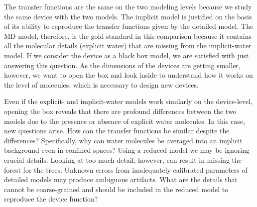 \documentclass[fleqn,10pt]{SelfArx} %
\begin{document}
The transfer functions are the same on the two modeling levels because we study the same device with the two models.
The implicit model is justified on the basis of its ability to reproduce the transfer functions given by the detailed model.
The MD model, therefore, is the gold standard in this comparison because it contains all the molecular details (explicit water) that are missing from the implicit-water model.
If we consider the device as a black box model, we are satisfied with just answering this question.
As the dimensions of the devices are getting smaller, however, we want to open the box and look inside to understand how it works on the level of molecules, which is necessary to design new devices.

Even if the explicit- and implicit-water models work similarly on the device-level, opening the box reveals that there are profound differences between the two models due to the presence or absence of explicit water molecules.
In this case, new questions arise.
How can the transfer functions be similar despite the differences?
Specifically, why can water molecules be averaged into an implicit background even in confined spaces? 
Using a reduced model we may be ignoring crucial details.
Looking at too much detail, however, can result in missing the forest for the trees.
Unknown errors from inadequately calibrated parameters of detailed models may produce ambiguous artifacts.
What are the details that cannot be coarse-grained and should be included in the reduced model to reproduce the device function?
\end{document}
